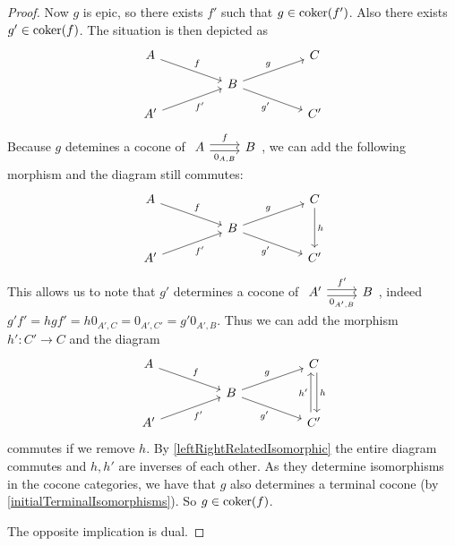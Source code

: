 \begin{proof}
Now $g$ is epic, so there exists $f'$ such that $g\in\operatorname{coker}(f')$. Also there exists $g'\in\operatorname{coker}(f)$. The situation is then depicted as
\[ \begin{tikzcd}[row sep=small, column sep=huge]
A \arrow[dr, "{f}"] & {} & C \\
{} & B \arrow[ur, "{g}"] \arrow[dr, swap, "{g'}"] & {} \\
A' \arrow[ur, swap, "{f'}"] & {} & C'
\end{tikzcd} \]
Because $g$ detemines a cocone of $\begin{tikzcd}
A \arrow[r, shift left, "f"] \arrow[r, shift right, swap, "{0_{A,B}}"] & B
\end{tikzcd}$, we can add the following morphism and the diagram still commutes:
\[ \begin{tikzcd}[row sep=small, column sep=huge]
A \arrow[dr, "{f}"] & {} & C \arrow[dd, "h"] \\
{} & B \arrow[ur, "{g}"] \arrow[dr, swap, "{g'}"] & {} \\
A' \arrow[ur, swap, "{f'}"] & {} & C'
\end{tikzcd} \]
This allows us to note that $g'$ determines a cocone of $\begin{tikzcd}
A' \arrow[r, shift left, "f'"] \arrow[r, shift right, swap, "{0_{A',B}}"] & B
\end{tikzcd}$, indeed $g'f' = hgf' = h0_{A',C} = 0_{A',C'} = g'0_{A',B}$. Thus we can add the morphism $h': C'\to C$ and the diagram
\[ \begin{tikzcd}[row sep=small, column sep=huge]
A \arrow[dr, "{f}"] & {} & C \arrow[dd, shift left, "h"] \\
{} & B \arrow[ur, "{g}"] \arrow[dr, swap, "{g'}"] & {} \\
A' \arrow[ur, swap, "{f'}"] & {} & C' \arrow[uu, shift left, "{h'}"]
\end{tikzcd} \]
commutes if we remove $h$. By \ref{leftRightRelatedIsomorphic} the entire diagram commutes and $h,h'$ are inverses of each other. As they determine isomorphisms in the cocone categories, we have that $g$ also determines a terminal cocone (by \ref{initialTerminalIsomorphisms}). So $g\in \operatorname{coker}(f)$.

The opposite implication is dual.
\end{proof}

